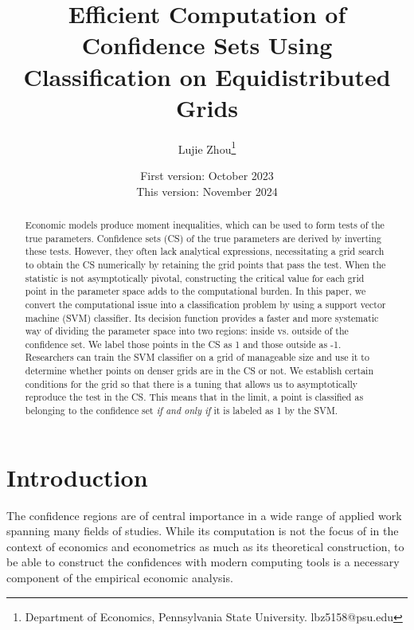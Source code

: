 \documentclass[12pt]{article}
\title{Efficient Computation of Confidence Sets Using Classification on Equidistributed Grids}
\author{Lujie Zhou\footnote{Department of Economics, Pennsylvania State University. lbz5158@psu.edu}}
\date{\normalsize First version: October 2023 \\
This version: November 2024}
\theoremstyle{definition}
\begin{document}
\maketitle


\begin{abstract}
Economic models produce moment inequalities, which can be used to form tests of the true parameters. Confidence sets (CS) of the true parameters are derived by inverting these tests. However, they often lack analytical expressions, necessitating a grid search to obtain the CS numerically by retaining the grid points that pass the test. When the statistic is not asymptotically pivotal, constructing the critical value for each grid point in the parameter space adds to the computational burden. In this paper, we convert the computational issue into a classification problem by using a support vector machine (SVM) classifier. Its decision function provides a faster and more systematic way of dividing the parameter space into two regions: inside vs. outside of the confidence set. We label those points in the CS as 1 and those outside as -1. Researchers can train the SVM classifier on a grid of manageable size and use it to determine whether points on denser grids are in the CS or not. We establish certain conditions for the grid so that there is a tuning that allows us to asymptotically reproduce the test in the CS. This means that in the limit, a point is classified as belonging to the confidence set \textit{if and only if} it is labeled as 1 by the SVM. 

\end{abstract}


\thispagestyle{fancy}

\section{Introduction}
\indent \par
The confidence regions are of central importance in a wide range of applied work spanning many fields of studies. While its computation is not the focus of in the context of economics and econometrics as much as its theoretical construction, to be able to construct the confidences with modern computing tools is a necessary component of the empirical economic analysis. 
\end{document}

